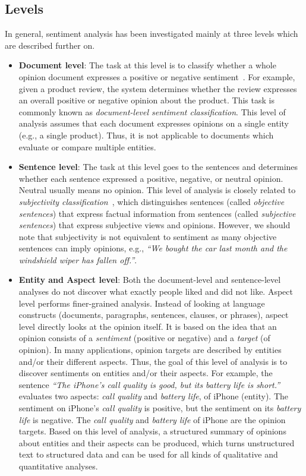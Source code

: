 \subsection{Levels}
\label{subsec:levels}

In general,
sentiment analysis has been investigated mainly at three levels
which are described further on.

\begin{itemize}
 \item \textbf{Document level}: The task at this level is
 to classify whether a whole opinion document expresses a positive or negative sentiment~\cite{PLV02}.
 For example, given a product review, the system determines
 whether the review expresses an overall positive or negative opinion
 about the product.
 This task is commonly known as \emph{document-level sentiment classification}. This level of analysis assumes that each document expresses opinions
 on a single entity (e.g., a single product).
 Thus, it is not applicable to documents which evaluate
 or compare multiple entities.
 
 \item \textbf{Sentence level}: The task at this level goes to the sentences
 and determines whether each sentence expressed a positive, negative,
 or neutral opinion.
 Neutral usually means no opinion.
 This level of analysis is closely related
 to \emph{subjectivity classification}~\cite{WBO99},
 which distinguishes sentences (called \emph{objective sentences})
 that express factual information
 from sentences (called \emph{subjective sentences})
 that express subjective views and opinions.
 However, we should note that subjectivity is not equivalent to sentiment
 as many objective sentences can imply opinions,
 e.g., \emph{``We bought the car last month
 and the windshield wiper has fallen off.''}.
 
 \item \textbf{Entity and Aspect level}: Both the document-level
 and sentence-level analyses do not discover
 what exactly people liked and did not like.
 Aspect level performs finer-grained analysis.
 Instead of looking at language constructs
 (documents, paragraphs, sentences, clauses, or phrases),
 aspect level directly looks at the opinion itself.
 It is based on the idea that an opinion consists
 of a \emph{sentiment} (positive or negative) and a \emph{target} (of opinion).
 In many applications,
 opinion targets are described by entities and/or their different aspects.
 Thus, the goal of this level of analysis is
 to discover sentiments on entities and/or their aspects.
 For example, the sentence
 \emph{``The iPhone's call quality is good, but its battery life is short.''} evaluates two aspects:
 \emph{call quality} and \emph{battery life}, of iPhone (entity).
 The sentiment on iPhone's \emph{call quality} is positive,
 but the sentiment on its \emph{battery life} is negative.
 The \emph{call quality} and \emph{battery life}
 of iPhone are the opinion targets.
 Based on this level of analysis,
 a structured summary of opinions about entities and their aspects
 can be produced, which turns unstructured text to structured data
 and can be used for all kinds of qualitative and quantitative analyses.
\end{itemize}


